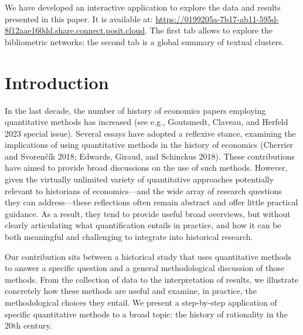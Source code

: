 \documentclass[
]{interact}
\begin{document}
\begin{tcolorbox}[enhanced jigsaw, bottomtitle=1mm, left=2mm, title=\textcolor{quarto-callout-note-color}{\faInfo}\hspace{0.5em}{Interactive application to explore the data}, leftrule=.75mm, colframe=quarto-callout-note-color-frame, opacityback=0, arc=.35mm, toptitle=1mm, colbacktitle=quarto-callout-note-color!10!white, breakable, rightrule=.15mm, coltitle=black, titlerule=0mm, colback=white, opacitybacktitle=0.6, toprule=.15mm, bottomrule=.15mm]

We have developed an interactive application to explore the data and
results presented in this paper. It is available at:
\url{https://0199205a-7b17-ab11-595d-8f12aae160dd.share.connect.posit.cloud}.
The first tab allows to explore the bibliometric networks; the second
tab is a global summary of textual clusters.

\end{tcolorbox}

\section{Introduction}\label{introduction}

In the last decade, the number of history of economics papers employing
quantitative methods has increased (see e.g., Goutsmedt, Claveau, and
Herfeld 2023 special issue). Several essays have adopted a reflexive
stance, examining the implications of using quantitative methods in the
history of economics (Cherrier and Svorenčík 2018; Edwards, Giraud, and
Schinckus 2018). These contributions have aimed to provide broad
discussions on the use of such methods. However, given the virtually
unlimited variety of quantitative approaches potentially relevant to
historians of economics---and the wide array of research questions they
can address---these reflections often remain abstract and offer little
practical guidance. As a result, they tend to provide useful broad
overviews, but without clearly articulating what quantification entails
in practice, and how it can be both meaningful and challenging to
integrate into historical research.

Our contribution sits between a historical study that uses quantitative
methods to answer a specific question and a general methodological
discussion of those methods. From the collection of data to the
interpretation of results, we illustrate concretely how these methods
are useful and examine, in practice, the methodological choices they
entail. We present a step-by-step application of specific quantitative
methods to a broad topic: the history of rationality in the 20th
century.
\end{document}
